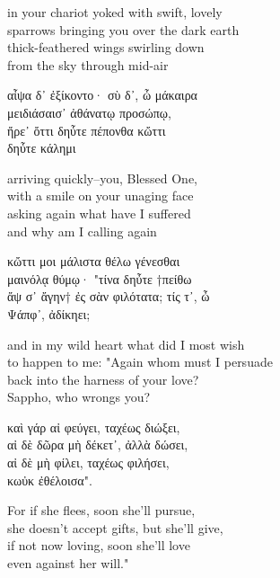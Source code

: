 \documentclass{report}
\begin{document}
in your chariot yoked with swift, lovely\\
sparrows bringing you over the dark earth\\
thick-feathered wings swirling down\\
from the sky through mid-air
\\

\begin{otherlanguage}{greek}
αἶψα δ᾽ ἐξίκοντο· σὺ δ᾽, ὦ μάκαιρα\\
μειδιάσαισ᾽ ἀθάνατῳ προσώπῳ,\\
ἤρε᾽ ὄττι δηὖτε πέπονθα κὤττι\\
δηὖτε κάλημι
\end{otherlanguage}

arriving quickly--you, Blessed One,\\
with a smile on your unaging face\\
asking again what have I suffered\\
and why am I calling again
\\

\begin{otherlanguage}{greek}
κὤττι μοι μάλιστα θέλω γένεσθαι\\
μαινόλᾳ θύμῳ· "τίνα δηὖτε †πείθω\\
ἄψ σ᾽ ἄγην† ἐς σὰν φιλότατα; τίς τ᾽, ὦ\\
Ψάπφ᾽, ἀδίκηει;
\end{otherlanguage}

and in my wild heart what did I most wish\\
to happen to me: "Again whom must I persuade\\
back into the harness of your love?\\
Sappho, who wrongs you?
\\

\begin{otherlanguage}{greek}
καὶ γάρ αἰ φεύγει, ταχέως διώξει,\\
αἰ δὲ δῶρα μὴ δέκετ᾽, ἀλλὰ δώσει,\\
αἰ δὲ μὴ φίλει, ταχέως φιλήσει,\\
κωὐκ ἐθέλοισα".
\end{otherlanguage}

For if she flees, soon she'll pursue,\\
she doesn't accept gifts, but she'll give,\\
if not now loving, soon she'll love\\
even against her will."
\\
\end{document}
